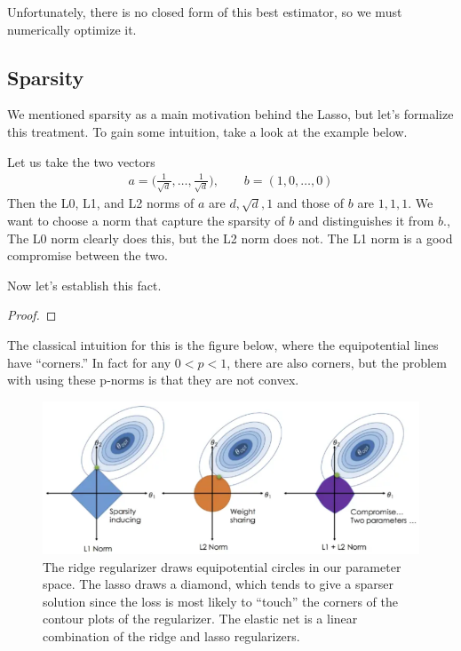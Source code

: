   Unfortunately, there is no closed form of this best estimator, so we must numerically optimize it. 

\subsection{Sparsity}

  We mentioned sparsity as a main motivation behind the Lasso, but let's formalize this treatment. To gain some intuition, take a look at the example below. 

  \begin{example}
    Let us take the two vectors 
    \begin{align}
      a = \bigg( \frac{1}{\sqrt{d}}, \ldots, \frac{1}{\sqrt{d}} \bigg), \qquad b = ( 1, 0, \ldots, 0)
    \end{align}
    Then the L0, L1, and L2 norms of $a$ are $d, \sqrt{d}, 1$ and those of $b$ are $1, 1, 1$. We want to choose a norm that capture the sparsity of $b$ and distinguishes it from $b$., The L0 norm clearly does this, but the L2 norm does not. The L1 norm is a good compromise between the two. 
  \end{example}

  Now let's establish this fact. 

  \begin{theorem}
    
  \end{theorem}
  \begin{proof}
    
  \end{proof}

  The classical intuition for this is the figure below, where the equipotential lines have ``corners.'' In fact for any $0 < p < 1$, there are also corners, but the problem with using these p-norms is that they are not convex. 

  \begin{figure}[H]
    \centering 
    \includegraphics[scale=0.5]{img/regularizers.png}
    \caption{The ridge regularizer draws equipotential circles in our parameter space. The lasso draws a diamond, which tends to give a sparser solution since the loss is most likely to ``touch'' the corners of the contour plots of the regularizer. The elastic net is a linear combination of the ridge and lasso regularizers.} 
    \label{fig:regularizers_visual}
  \end{figure}

